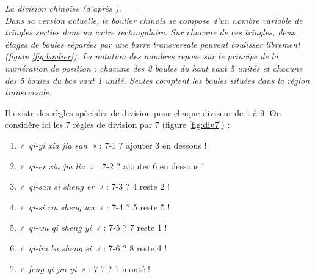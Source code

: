 \begin{td}\label{td:boulier}\em La division chinoise (d'après \cite{chabert}).\\
Dans sa version actuelle, le boulier chinois se compose d'un nombre variable de tringles
serties dans un cadre rectangulaire. Sur chacune de ces tringles, deux étages de boules
séparées par une barre transversale peuvent coulisser librement (figure \ref{fig:boulier}).
La notation des nombres repose sur le principe de la numération de position : chacune
des 2 boules du haut vaut 5 unités et chacune des 5 boules du bas vaut 1 unité. Seules
comptent les boules situées dans la région transversale.

Il existe des règles spéciales de division pour chaque diviseur de 1 à 9.
On consid\`ere ici les 7 r\`egles de division par 7 (figure \ref{fig:div7}) :

\noindent\begin{minipage}[t]{7cm}\footnotesize
\begin{enumerate}
\item {\em «~qi-yi xia jia san~»} : 7-1 ? ajouter 3 en dessous ! \\
\item {\em «~qi-er xia jia liu~»} : 7-2 ? ajouter 6 en dessous ! \\
\item {\em «~qi-san si sheng er~»} : 7-3 ? 4 reste 2 ! \\
\end{enumerate}
\end{minipage}\hfill
\begin{minipage}[t]{7cm}\footnotesize
\begin{enumerate}\setcounter{enumi}{3}
\item {\em «~qi-si wu sheng wu~»} : 7-4 ? 5 reste 5 ! \\
\item {\em «~qi-wu qi sheng yi~»} : 7-5 ? 7 reste 1 ! \\
\item {\em «~qi-liu ba sheng si~»} : 7-6 ? 8 reste 4 ! \\
\item {\em «~feng-qi jin yi~»} : 7-7 ? 1 monté ! \\
\end{enumerate}
\end{minipage}


\end{td}
